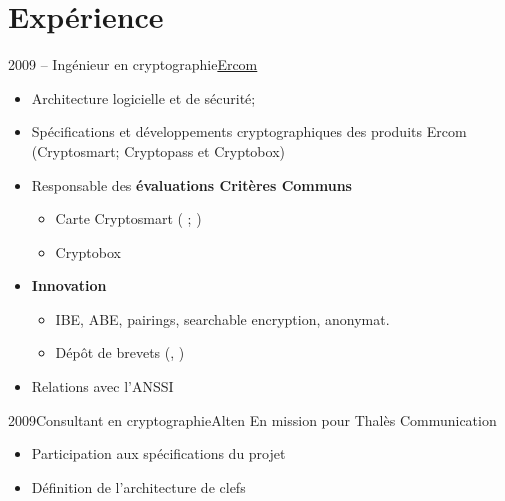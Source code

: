 \documentclass[a4paper]{customcv}
\begin{document}
\makeprofile
\section{Expérience}

\begin{cventry}{2009 -- }{Ingénieur en cryptographie}{\href{https://www.ercom.fr/}{Ercom}}
  \begin{itemize}
    \item  Architecture logicielle et de sécurité;
    \item Spécifications et développements cryptographiques des produits Ercom (Cryptosmart; Cryptopass et Cryptobox)
    \item Responsable des \textbf{évaluations Critères Communs}
          \begin{itemize}
            \item Carte Cryptosmart (\cite{anssi.2012/71} ; \cite{anssi.2016/69})
            \item Cryptobox \cite{anssi.2018/23}
          \end{itemize}
    \item \textbf{Innovation}
          \begin{itemize}
            \item IBE, ABE, pairings, searchable encryption, anonymat.
            \item Dépôt de brevets (\cite{pat.save}, \cite{pat.card.auth})
          \end{itemize}
    \item Relations avec l'ANSSI
  \end{itemize}
\end{cventry}

\begin{cventry}{2009}{Consultant en cryptographie}{Alten}
  En mission pour Thalès Communication
  \begin{itemize}
    \item Participation aux spécifications du projet
    \item Définition de l'architecture de clefs
  \end{itemize}
\end{cventry}
\end{document}
